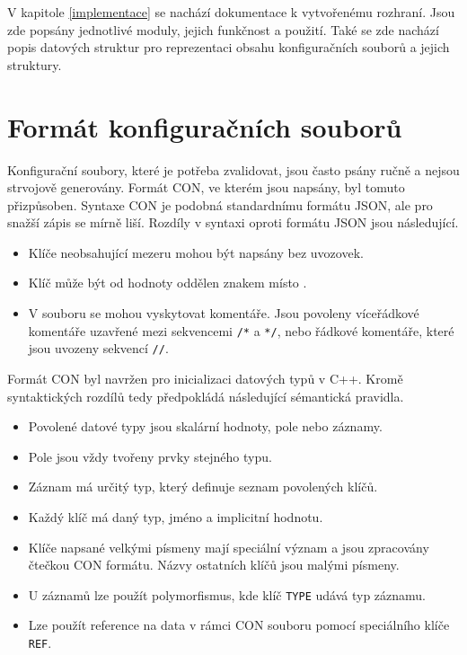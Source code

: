 \documentclass[FM,MP]{tulthesis}
\begin{document}
	V kapitole \ref{implementace} se nachází dokumentace k vytvořenému rozhraní. Jsou zde popsány jednotlivé moduly, jejich funkčnost a použití. Také se zde nachází popis datových struktur pro reprezentaci obsahu konfiguračních souborů a jejich struktury.


\chapter{Formát konfiguračních souborů}
	\label{format-con}
	Konfigurační soubory, které je potřeba zvalidovat, jsou často psány ručně a nejsou strvojově generovány. Formát CON, ve kterém jsou napsány, byl tomuto přizpůsoben. Syntaxe CON je podobná standardnímu formátu JSON, ale pro snažší zápis se mírně liší. Rozdíly v syntaxi oproti formátu JSON jsou následující.
	\begin{itemize}
		\item Klíče neobsahující mezeru mohou být napsány bez uvozovek.
		\item Klíč může být od hodnoty oddělen znakem \uv{\texttt{$=$}} místo \uv{\texttt{$:$}}.
		\item V souboru se mohou vyskytovat komentáře. Jsou povoleny víceřádkové komentáře uzavřené mezi sekvencemi \texttt{/*} a \texttt{*/}, nebo řádkové komentáře, které jsou uvozeny sekvencí \texttt{//}.
	\end{itemize}


	\label{semantika-con}
	Formát CON byl navržen pro inicializaci datových typů v C++. Kromě syntaktických rozdílů tedy předpokládá následující sémantická pravidla.
	\begin{itemize}
		\item Povolené datové typy jsou skalární hodnoty, pole nebo záznamy.
		\item Pole jsou vždy tvořeny prvky stejného typu.
		\item Záznam má určitý typ, který definuje seznam povolených klíčů.
		\item Každý klíč má daný typ, jméno a implicitní hodnotu.
		\item Klíče napsané velkými písmeny mají speciální význam a jsou zpracovány čtečkou CON formátu. Názvy ostatních klíčů jsou malými písmeny.
		\item U záznamů lze použít polymorfismus, kde klíč \texttt{TYPE} udává typ záznamu.
		\item Lze použít reference na data v rámci CON souboru pomocí speciálního klíče \texttt{REF}.
	\end{itemize}
\end{document}
